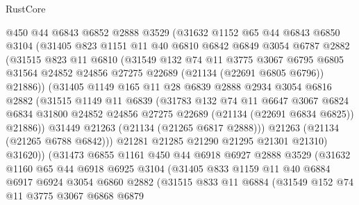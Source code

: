 \begin{lexlean}{RustCore}
\begin{coremodule}
          @450
          @44
          @6843
          @6852
          @2888
          @3529
          (@31632
            @1152
            @65
            @44
            @6843
            @6850
            @3104
            (@31405
              @823
              @1151
              @11
              @40
              @6810
              @6842
              @6849
              @3054
              @6787
              @2882
              (@31515
                @823
                @11
                @6810
                (@31549
                  @132
                  @74
                  @11
                  @3775
                  @3067
                  @6795
                  @6805
                  @31564
                  @24852
                  @24856
                  @27275
                  @22689
                  (@21134 (@22691 @6805 @6796))
                  @21886))
              (@31405
                @1149
                @165
                @11
                @28
                @6839
                @2888
                @2934
                @3054
                @6816
                @2882
                (@31515
                  @1149
                  @11
                  @6839
                  (@31783
                    @132
                    @74
                    @11
                    @6647
                    @3067
                    @6824
                    @6834
                    @31800
                    @24852
                    @24856
                    @27275
                    @22689
                    (@21134 (@22691 @6834 @6825))
                    @21886))
                @31449
                @21263
                (@21134 (@21265 @6817 @2888)))
              @21263
              (@21134 (@21265 @6788 @6842)))
            @21281
            @21285
            @21290
            @21295
            @21301
            @21310)
          @31620))
      (@31473
        @6855
        @1161
        @450
        @44
        @6918
        @6927
        @2888
        @3529
        (@31632
          @1160
          @65
          @44
          @6918
          @6925
          @3104
          (@31405
            @833
            @1159
            @11
            @40
            @6884
            @6917
            @6924
            @3054
            @6860
            @2882
            (@31515
              @833
              @11
              @6884
              (@31549
                @152
                @74
                @11
                @3775
                @3067
                @6868
                @6879

\end{coremodule}
\end{lexlean}
